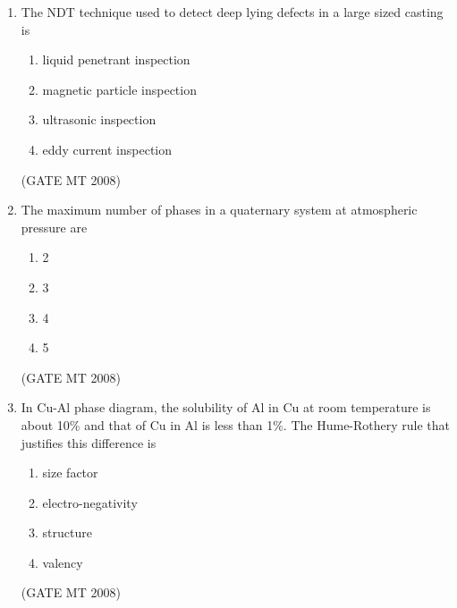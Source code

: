 \documentclass[11pt, letterpaper]{article}
\theoremstyle{remark}
\begin{document}
\begin{enumerate}[label=Q.\arabic*]
\item The NDT technique used to detect deep lying defects in a large sized casting is
\vspace{-0.9em}
\begin{multicols}{2}
      \begin{enumerate}[label=(\MakeUppercase{\alph*})]
        \item liquid penetrant inspection
        \item magnetic particle inspection
        \item ultrasonic inspection
        \item eddy current inspection
      \end{enumerate}
    \end{multicols}
\vspace{-5mm}
\hfill(GATE MT 2008)

\item The maximum number of phases in a quaternary system at atmospheric pressure are
\vspace{-0.9em}
\begin{multicols}{4}
 \begin{enumerate}[label=(\MakeUppercase{\alph*})]
  \item 2
  \item 3 
  \item 4
  \item 5
 \end{enumerate}
\end{multicols}
\vspace{-5mm}
\hfill(GATE MT 2008)

\item In Cu-Al phase diagram, the solubility of Al in Cu at room temperature is about 10\% and that of Cu in Al is less than 1\%. The Hume-Rothery rule that justifies this difference is
\vspace{-0.9em}
\begin{multicols}{2}
      \begin{enumerate}[label=(\MakeUppercase{\alph*})]
        \item size factor
        \item electro-negativity
        \item structure
        \item valency
      \end{enumerate}
    \end{multicols}
\vspace{-5mm}
\hfill(GATE MT 2008)


\end{enumerate}
\end{document}
